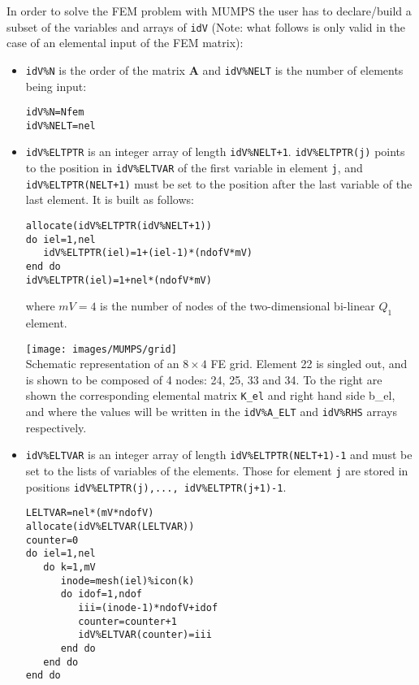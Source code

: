In order to solve the FEM problem with MUMPS the user has to declare/build 
a subset of the variables and arrays of {\tt idV} (Note: what follows is only valid in 
the case of an elemental input of the FEM matrix):
\begin{itemize}
\item {\tt idV\%N} is the order of the matrix ${\bm A}$
and {\tt idV\%NELT} is the number of elements being input:
\begin{verbatim}
idV%N=Nfem    
idV%NELT=nel
\end{verbatim}

\item {\tt idV\%ELTPTR} is an integer array of 
length {\tt idV\%NELT+1}. {\tt idV\%ELTPTR(j)} points to the position in {\tt idV\%ELTVAR}
of the first variable in element {\tt j}, and {\tt idV\%ELTPTR(NELT+1)} must be set to 
the position after the last variable of the last element. It is built as follows: 

\begin{lstlisting}
allocate(idV%ELTPTR(idV%NELT+1))
do iel=1,nel                         
   idV%ELTPTR(iel)=1+(iel-1)*(ndofV*mV)   
end do                         
idV%ELTPTR(iel)=1+nel*(ndofV*mV) 
\end{lstlisting}
where $mV=4$ is the number of nodes of the two-dimensional bi-linear $Q_1$ element.

\begin{center}
\texttt{[image: images/MUMPS/grid]}\\
{\captionfont Schematic representation of an $8\times4$ FE grid. 
Element 22 is singled out, and is shown to
be composed of 4 nodes: 24, 25, 33 and 34. To the right are shown the corresponding elemental
matrix {\tt K\_el} and right hand side {b\_el}, and where the values will be written in the
{\tt idV\%A\_ELT} and {\tt idV\%RHS} arrays respectively.}
\end{center}


\item {\tt idV\%ELTVAR} is an integer array of length {\tt idV\%ELTPTR(NELT+1)-1} and must 
be set to the lists of variables of the elements. 
Those for element {\tt j} are stored in positions {\tt idV\%ELTPTR(j),..., idV\%ELTPTR(j+1)-1}. 
\begin{verbatim}
LELTVAR=nel*(mV*ndofV)  
allocate(idV%ELTVAR(LELTVAR))
counter=0   
do iel=1,nel 
   do k=1,mV    
      inode=mesh(iel)%icon(k)  
      do idof=1,ndof    
         iii=(inode-1)*ndofV+idof   
         counter=counter+1         
         idV%ELTVAR(counter)=iii   
      end do                   
   end do                 
end do               
\end{verbatim}



\end{itemize}
